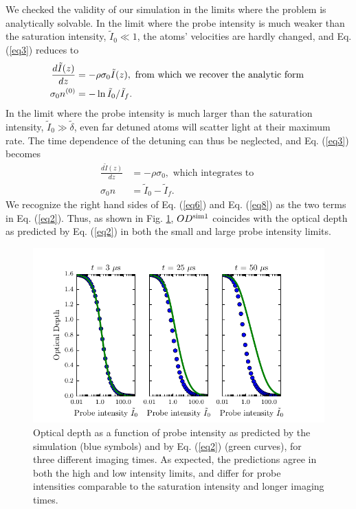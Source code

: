 \par We checked the validity of our simulation in the limits where the problem is analytically solvable. In the limit where the probe intensity is much weaker than the saturation intensity, $\tilde{I}_0\ll 1$, the atoms' velocities are hardly changed, and Eq.(\ref{eq3}) reduces to
\begin{eqnarray}
\frac{d\tilde{I}(z)}{dz}&=-\rho\sigma_0\tilde{I}(z), \mbox{ from which we recover the analytic form }\\
\sigma_0 n^{\rm{(0)}} &= -\ln\tilde{I}_0/\tilde{I}_f. \label{eq6}
\end{eqnarray}
In the limit where the probe intensity is much larger than the saturation intensity, $\tilde{I}_0\gg \tilde{\delta}$, even far detuned atoms will scatter light at their maximum rate. The time dependence of the detuning can thus be neglected, and Eq. (\ref{eq3}) becomes
\begin{eqnarray}
\frac{d\tilde{I}(z)}{dz}&=-\rho\sigma_0, \mbox{ which integrates to }\\
\sigma_0 n &= \tilde{I}_0 - \tilde{I}_f. \label{eq8}
\end{eqnarray}
We recognize the right hand sides of Eq. (\ref{eq6}) and Eq. (\ref{eq8}) as the two terms in Eq. (\ref{eq2}). Thus, as shown in  Fig. \ref{fig:IsatLimits}, $OD^{\rm{sim1}}$  coincides with the optical depth as predicted by Eq. (\ref{eq2}) in both the small and large probe intensity limits.
\begin{figure}
	\includegraphics{Chapter4 Figures/figure3.pdf}
\caption{Optical depth as a function of probe intensity as predicted by the simulation (blue symbols) and by Eq. (\ref{eq2}) (green curves), for three different imaging times. As expected, the predictions agree in both the high and low intensity limits, and differ for probe intensities comparable to the saturation intensity and longer imaging times. }
\label{fig:IsatLimits}
\end{figure}

